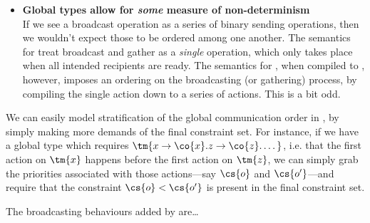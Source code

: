 \documentclass{article}
\begin{document}
\begin{itemize}
  The coherence rules presented by \textcite{carbone2016} are all asymmetric. In
  each case, \emph{one} process on the one side is communicating with multiple
  processes on the other. In each case, the side with \emph{one} process happens
  to be the ``strong'' side---the side which decides in which order
  communications happen $(\parr)$, and the side which makes the choice
  $(\plus)$. This, of course, is no coincidence. Instead, it has a much deeper
  connection to the logic. In each case, these stronger connectives are
  associated with \emph{unary} instead of binary rules. This makes it easy to
  expand a ``gather'' into a series of receive actions, and a choice into a
  series of choices.\footnote{This means that it should be possible to define a
    globally-governed variant of, say, \hccp or \ccp, in which both the plumbing
    and the choice are taken care of by broadcasting operations.}
\item
  \textbf{Global types allow for \emph{some} measure of non-determinism}\\
  If we see a broadcast operation as a series of binary sending operations, then
  we wouldn't expect those to be ordered among one another. The semantics for
  \gcp treat broadcast and gather as a \emph{single} operation, which only takes
  place when all intended recipients are ready. The semantics for \gcp, when
  compiled to \cp, however, imposes an ordering on the broadcasting (or
  gathering) process, by compiling the single action down to a series of
  actions. This is a bit odd.
\end{itemize}
We can easily model stratification of the global communication order in \cccp,
by simply making more demands of the final constraint set.
For instance, if we have a global type which requires
$\tm{{x}\to{\co{x}}.{z}\to{\co{z}}.\dots}$, i.e. that the first action on
$\tm{x}$ happens before the first action on $\tm{z}$, we can simply grab the
priorities associated with those actions---say $\cs{o}$ and $\cs{o'}$---and
require that the constraint $\cs{o} < \cs{o'}$ is present in the final
constraint set.

The broadcasting behaviours added by \gcp are\dots
\end{document}
